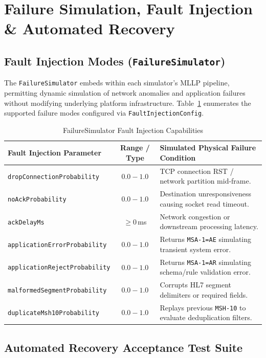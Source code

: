 \section{Failure Simulation, Fault Injection \& Automated Recovery}
\label{sec:paradeigma_failure}

\subsection{Fault Injection Modes (\texttt{FailureSimulator})}

The \texttt{FailureSimulator} embeds within each simulator's MLLP pipeline, permitting dynamic simulation of network anomalies and application failures without modifying underlying platform infrastructure. Table~\ref{tab:fault_modes} enumerates the supported failure modes configured via \texttt{FaultInjectionConfig}.

\begin{table}[htbp]
\centering
\small
\begin{tabularx}{\textwidth}{l c p{7.5cm}}
\toprule
\textbf{Fault Injection Parameter} & \textbf{Range / Type} & \textbf{Simulated Physical Failure Condition} \\
\midrule
\texttt{dropConnectionProbability} & $0.0 - 1.0$ & TCP connection RST / network partition mid-frame. \\
\texttt{noAckProbability} & $0.0 - 1.0$ & Destination unresponsiveness causing socket read timeout. \\
\texttt{ackDelayMs} & $\ge 0$\,ms & Network congestion or downstream processing latency. \\
\texttt{applicationErrorProbability} & $0.0 - 1.0$ & Returns \texttt{MSA-1=AE} simulating transient system error. \\
\texttt{applicationRejectProbability} & $0.0 - 1.0$ & Returns \texttt{MSA-1=AR} simulating schema/rule validation error. \\
\texttt{malformedSegmentProbability} & $0.0 - 1.0$ & Corrupts HL7 segment delimiters or required fields. \\
\texttt{duplicateMsh10Probability} & $0.0 - 1.0$ & Replays previous \texttt{MSH-10} to evaluate deduplication filters. \\
\bottomrule
\end{tabularx}
\caption{FailureSimulator Fault Injection Capabilities}
\label{tab:fault_modes}
\end{table}

\subsection{Automated Recovery Acceptance Test Suite}

